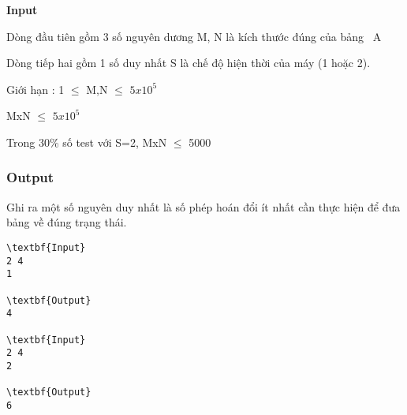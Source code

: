 \textbf{Input }\textbf{}

Dòng đầu tiên gồm 3 số nguyên dương M, N là kích thước đúng của bảng  A

Dòng tiếp hai gồm 1 số duy nhất S là chế độ hiện thời của máy (1 hoặc 2).

Giới hạn : 1  $\le$  M,N  $\le$  $5x10^{5}$

MxN  $\le$  $5x10^{5}$

Trong 30\% số test với S=2, MxN  $\le$  5000

\subsubsection{Output}

Ghi ra một số nguyên duy nhất là số phép hoán đổi ít nhất cần thực hiện để đưa bảng về đúng trạng thái.
\begin{verbatim}
\textbf{Input}
2 4
1

\textbf{Output}
4

\textbf{Input}
2 4
2

\textbf{Output}
6\end{verbatim}
